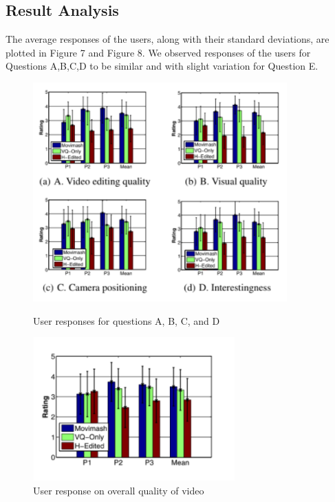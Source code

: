 \documentclass{sig-alternate-05-2015}
\begin{document}
\subsection{Result Analysis}
The average responses of the users, along with their standard
deviations, are plotted in Figure 7 and Figure 8. We observed responses of the users for Questions A,B,C,D to be similar and with
slight variation for Question E.

\begin{figure}[t]
\includegraphics[width=1\linewidth]{img7.png}
\caption{User responses for questions A, B, C, and D}
\includegraphics[width=1\linewidth]{img8.png}
\caption{User response on overall quality of video}
\label{fig:block-diagram}
\end{figure}
\end{document}
